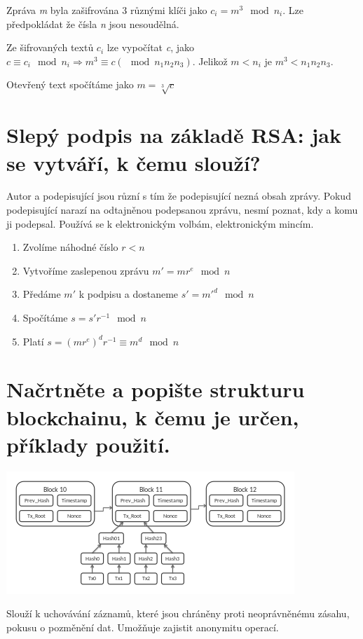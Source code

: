 Zpráva \textit{m} byla zašifrována 3 různými klíči jako $c_i = m^3 \mod n_i$. Lze předpokládat že čísla \textit{n} jsou nesoudělná.

Ze šifrovaných textů $c_i$ lze vypočítat \textit{c}, jako $c \equiv c_i \mod n_i \Rightarrow m^3 \equiv c(\mod n_1n_2n_3)$. Jelikož $m < n_i$ je $m^3 < n_1n_2n_3$.

Otevřený text spočítáme jako $m = \sqrt[3]{c}$
 
\section{Slepý podpis na základě RSA: jak se vytváří, k čemu slouží?}

Autor a podepisující jsou různí s tím že podepisující nezná obsah zprávy. Pokud podepisující narazí na odtajněnou podepsanou zprávu, nesmí poznat, kdy a komu ji podepsal. Používá se k elektronickým volbám, elektronickým mincím. 

\begin{enumerate}
    \item Zvolíme náhodné číslo $r < n$
    \item Vytvoříme zaslepenou zprávu $m' = mr^e \mod n$
    \item Předáme $m'$ k podpisu a dostaneme $s' = m'^d \mod n$
    \item Spočítáme $s = s'r^{-1} \mod n$
    \item Platí $s = (mr^e)^dr^{-1}\equiv m^d \mod n$
\end{enumerate}


\section{Načrtněte a popište strukturu blockchainu, k čemu je určen, příklady použití.}

\begin{center}
\includegraphics[scale=0.7]{images/blockchain.png}
\end{center}

Slouží k uchovávání záznamů, které jsou chráněny proti neoprávněnému zásahu, pokusu o pozměnění dat. Umožňuje zajistit anonymitu operací. 

